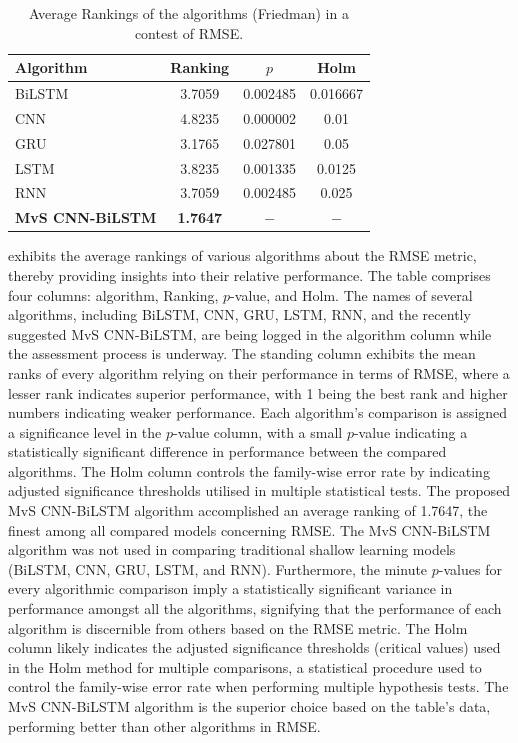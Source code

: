 \documentclass[a4paper, fleqn]{cas-sc}
\theoremstyle{definition}
\theoremstyle{remark}
\begin{document}
\begin{table}[!htp]
  \caption{Average Rankings of the algorithms (Friedman) in a contest of RMSE.}
  \centering
  \begin{tabular}{lccc}
  \hline
  Algorithm&Ranking&$p$&Holm\\\hline
  BiLSTM&3.7059&0.002485&0.016667\\
  CNN&4.8235&0.000002&0.01\\
  GRU&3.1765&0.027801&0.05\\
  LSTM&3.8235&0.001335&0.0125\\
  RNN&3.7059&0.002485&0.025\\
  \textbf{MvS CNN-BiLSTM}&\textbf{1.7647}&$-$ &$-$ \\\hline
\end{tabular}
\label{rank_rmse}
  \end{table}
   exhibits the average rankings of various algorithms about the RMSE metric,  thereby providing insights into their relative performance. The table comprises four columns: algorithm,  Ranking,  $p$-value,  and Holm. The names of several algorithms,  including BiLSTM,  CNN,  GRU,  LSTM,  RNN,  and the recently suggested MvS CNN-BiLSTM,  are being logged in the algorithm column while the assessment process is underway. The standing column exhibits the mean ranks of every algorithm relying on their performance in terms of RMSE,  where a lesser rank indicates superior performance, with 1 being the best rank and higher numbers indicating weaker performance. Each algorithm's comparison is assigned a significance level in the $p$-value column,  with a small $p$-value indicating a statistically significant difference in performance between the compared algorithms. The Holm column controls the family-wise error rate by indicating adjusted significance thresholds utilised in multiple statistical tests. The proposed MvS CNN-BiLSTM algorithm accomplished an average ranking of 1.7647, the finest among all compared models concerning RMSE. The MvS CNN-BiLSTM algorithm was not used in comparing traditional shallow learning models (BiLSTM,  CNN,  GRU,  LSTM,  and RNN). Furthermore,  the minute $p$-values for every algorithmic comparison imply a statistically significant variance in performance amongst all the algorithms,  signifying that the performance of each algorithm is discernible from others based on the RMSE metric. The Holm column likely indicates the adjusted significance thresholds (critical values) used in the Holm method for multiple comparisons, a statistical procedure used to control the family-wise error rate when performing multiple hypothesis tests. The MvS CNN-BiLSTM algorithm is the superior choice based on the table's data,  performing better than other algorithms in RMSE.
\end{document}
